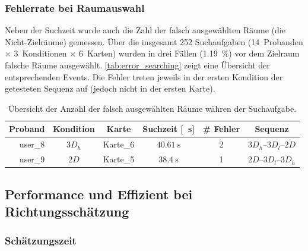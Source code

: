 \subsubsection*{Fehlerrate bei Raumauswahl}
Neben der Suchzeit wurde auch die Zahl der falsch ausgewählten Räume (die Nicht-Zielräume) gemessen.
Über die insgesamt 252 Suchaufgaben (14~Probanden $\times$ 3~Konditionen $\times$ 6~Karten) wurden in drei Fällen (\SI{1,19}{\percent}) vor dem Zielraum falsche Räume ausgewählt.
\autoref{tab:error_searching} zeigt eine Übersicht der entsprechenden Events.
Die Fehler treten jeweils in der ersten Kondition der getesteten Sequenz auf (jedoch nicht in der ersten Karte).
\begin{table}
    \centering
    \caption{Übersicht der Anzahl der falsch ausgewählten Räume währen der Suchaufgabe.}
    \label{tab:error_searching}
    \begin{tabular}{rccccc}\toprule
        Proband                  & Kondition               & Karte    & Suchzeit [\SI{}{\second}] & \# Fehler & Sequenz  \\\midrule
        user\_8                  & $3D_h$                  & Karte\_6 & $\SI{40,61}{\second}$     & 2         & $3D_h$--$3D_l$--$2D$ \\
        user\_9                  & $2D$                    & Karte\_5 & $\SI{38,4}{\second}$      & 1         & $2D$--$3D_l$--$3D_h$ \\\bottomrule
    \end{tabular}
\end{table}

\subsection{Performance und Effizient bei Richtungsschätzung}

\subsubsection*{Schätzungszeit}

